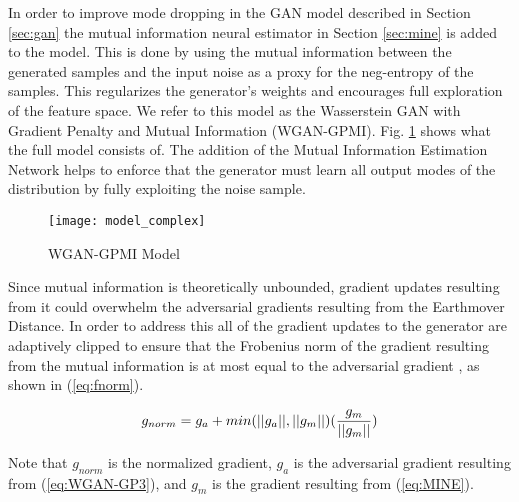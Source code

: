 In order to improve mode dropping in the GAN model described in Section \ref{sec:gan} the mutual information neural estimator in Section \ref{sec:mine} is added to the model. This is done by using the mutual information between the generated samples and the input noise as a proxy for the neg-entropy of the samples. This regularizes the generator's weights and encourages full exploration of the feature space. We refer to this model as the Wasserstein GAN with Gradient Penalty and Mutual Information (WGAN-GPMI). Fig. \ref{fig:model_complex} shows what the full model consists of. The addition of the Mutual Information Estimation Network helps to enforce that the generator must learn all output modes of the distribution by fully exploiting the noise sample.

\begin{figure}[!htbp]
	\centering%
	\texttt{[image: model\_complex]}
	\caption{WGAN-GPMI Model}
	\label{fig:model_complex}
\end{figure}

Since mutual information is theoretically unbounded, gradient updates resulting from it could overwhelm the adversarial gradients resulting from the Earthmover Distance. In order to address this all of the gradient updates to the generator are adaptively clipped to ensure that the Frobenius norm of the gradient resulting from the mutual information is at most equal to the adversarial gradient \cite{Belghazi2018}, as shown in (\ref{eq:fnorm}).

\begin{equation}
	g_{norm} = g_a + min(||{g_a}||, ||{g_m}||)({g_m \over ||g_m||})
	\label{eq:fnorm}
\end{equation}
 
Note that $g_{norm}$ is the normalized gradient, $g_a$ is the adversarial gradient resulting from (\ref{eq:WGAN-GP3}), and $g_m$ is the gradient resulting from (\ref{eq:MINE}). 



